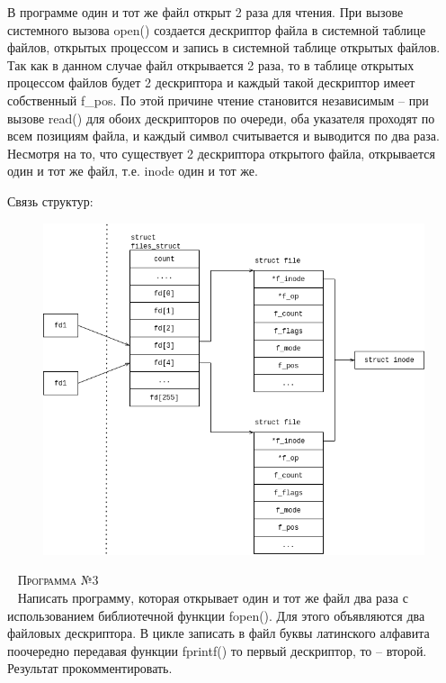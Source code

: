 В программе один и тот же файл открыт 2 раза для чтения.  При вызове системного вызова open() создается дескриптор файла в системной таблице файлов, открытых процессом и запись в системной таблице открытых  файлов.  Так как в данном случае файл открывается 2 раза, то в таблице открытых процессом файлов будет 2 дескриптора и каждый такой дескриптор имеет собственный f\_pos. По этой причине чтение становится независимым --  при вызове read() для обоих дескрипторов по очереди, оба указателя проходят по всем позициям файла, и каждый символ считывается и выводится по два раза. 
Несмотря на то, что существует 2 дескриптора открытого файла, открывается один и тот же файл, т.е. inode один и тот же.

Связь структур:
\begin{figure}[H]
	\centering
	\includegraphics[scale=0.7]{assets/d_2.png}
\end{figure}


~\newline
\textsc{\huge Программа №3} \\
~\newline
Написать программу, которая открывает один и тот же файл два раза с использованием библиотечной функции fopen(). Для этого объявляются два файловых дескриптора. В цикле записать в файл буквы латинского алфавита поочередно передавая функции fprintf() то первый дескриптор, то – второй.
Результат прокомментировать.

